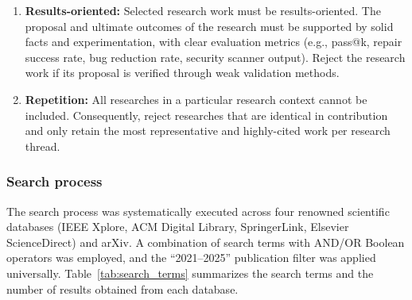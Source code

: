 \documentclass[10pt,a4paper]{article}
\begin{document}
\begin{enumerate}[leftmargin=*]
\item \textbf{Results-oriented:} Selected research work must be results-oriented. The proposal and ultimate outcomes of the research must be supported by solid facts and experimentation, with clear evaluation metrics (e.g., pass@k, repair success rate, bug reduction rate, security scanner output). Reject the research work if its proposal is verified through weak validation methods.
\item \textbf{Repetition:} All researches in a particular research context cannot be included. Consequently, reject researches that are identical in contribution and only retain the most representative and highly-cited work per research thread.
\end{enumerate}

\subsubsection{Search process}
\label{sec:search_process}
The search process was systematically executed across four renowned scientific databases (IEEE Xplore, ACM Digital Library, SpringerLink, Elsevier ScienceDirect) and arXiv. A combination of search terms with AND/OR Boolean operators was employed, and the ``2021--2025'' publication filter was applied universally. Table~\ref{tab:search_terms} summarizes the search terms and the number of results obtained from each database.
\end{document}
